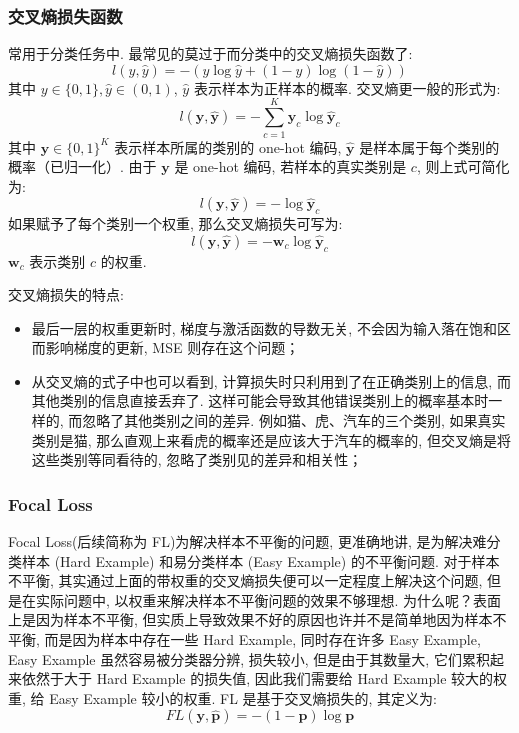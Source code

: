 \subsubsection{交叉熵损失函数}
常用于分类任务中. 最常见的莫过于而分类中的交叉熵损失函数了: 
$$
l(y, \hat{y}) = -(y \log \hat{y} + (1-y) \log (1-\hat{y}))
$$
其中 $y \in \{0, 1\}, \hat{y} \in (0, 1)$, $\hat y$ 表示样本为正样本的概率. 交叉熵更一般的形式为: 
$$
l(\boldsymbol{y}, \hat{\boldsymbol{y}}) = - \sum_{c=1}^K \boldsymbol{y}_c \log \hat{\boldsymbol{y}}_c
$$
其中 $\boldsymbol{y} \in \{0,1\}^K$ 表示样本所属的类别的 one-hot 编码, $\hat{\boldsymbol{y}}$ 是样本属于每个类别的概率（已归一化）. 由于 $\boldsymbol{y}$ 是 one-hot 编码, 若样本的真实类别是 $c$, 则上式可简化为: 
$$
l(\boldsymbol{y}, \hat{\boldsymbol{y}}) = - \log \hat{\boldsymbol{y}}_c
$$
如果赋予了每个类别一个权重, 那么交叉熵损失可写为: 
$$
l(\boldsymbol{y}, \hat{\boldsymbol{y}}) = - \boldsymbol{w}_c\log \hat{\boldsymbol{y}}_c
$$
$\boldsymbol{w}_c$ 表示类别 $c$ 的权重. 

交叉熵损失的特点: 
\begin{itemize}
	\item 最后一层的权重更新时, 梯度与激活函数的导数无关, 不会因为输入落在饱和区而影响梯度的更新, MSE 则存在这个问题；
	
	\item 从交叉熵的式子中也可以看到, 计算损失时只利用到了在正确类别上的信息, 而其他类别的信息直接丢弃了. 这样可能会导致其他错误类别上的概率基本时一样的, 而忽略了其他类别之间的差异. 例如猫、虎、汽车的三个类别, 如果真实类别是猫, 那么直观上来看虎的概率还是应该大于汽车的概率的, 但交叉熵是将这些类别等同看待的, 忽略了类别见的差异和相关性；	
\end{itemize}

\subsubsection{Focal Loss}
Focal Loss(后续简称为 FL)为解决样本不平衡的问题, 更准确地讲, 是为解决难分类样本 (Hard Example) 和易分类样本 (Easy Example) 的不平衡问题. 对于样本不平衡, 其实通过上面的带权重的交叉熵损失便可以一定程度上解决这个问题, 但是在实际问题中, 以权重来解决样本不平衡问题的效果不够理想. 为什么呢？表面上是因为样本不平衡, 但实质上导致效果不好的原因也许并不是简单地因为样本不平衡, 而是因为样本中存在一些 Hard Example, 同时存在许多 Easy Example, Easy Example 虽然容易被分类器分辨, 损失较小, 但是由于其数量大, 它们累积起来依然于大于 Hard Example 的损失值, 因此我们需要给 Hard Example 较大的权重, 给 Easy Example 较小的权重. FL 是基于交叉熵损失的, 其定义为: 
$$
FL(\boldsymbol{y}, \hat{\boldsymbol{p}}) = -(1-\boldsymbol{p}) \log \boldsymbol{p}
$$


